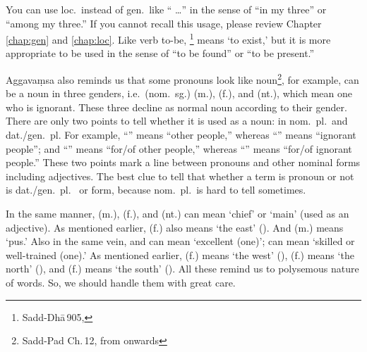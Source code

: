 
You can use loc.\ instead of gen.\ like `` \ldots'' in the sense of ``in my three'' or ``among my three.'' If you cannot recall this usage, please review Chapter \ref{chap:gen} and \ref{chap:loc}. Like verb to-be, \footnote{Sadd-Dh\=a\,905, } means `to exist,' but it is more appropriate to be used in the sense of ``to be found'' or ``to be present.''

Aggava\d msa also reminds us that some pronouns look like noun\footnote{Sadd-Pad Ch.\,12, from  onwards}, for example,  can be a noun in three genders, i.e.\ (nom.\ sg.)  (m.),  (f.), and  (nt.), which mean one who is ignorant. These three decline as normal noun according to their gender. There are only two points to tell whether it is used as a noun: in nom.\ pl.\ and dat./gen.\ pl. For example, ``'' means ``other people,'' whereas ``'' means ``ignorant people''; and ``'' means ``for/of other people,'' whereas ``'' means ``for/of ignorant people.'' These two points mark a line between pronouns and other nominal forms including adjectives. The best clue to tell that whether a term is pronoun or not is dat./gen.\ pl.\  or  form, because nom.\ pl.\ is hard to tell sometimes.

In the same manner,  (m.),  (f.), and  (nt.) can mean `chief' or `main' (used as an adjective). As mentioned earlier,  (f.) also means `the east' (). And  (m.) means `pus.' Also in the same vein,  and  can mean `excellent (one)';  can mean `skilled or well-trained (one).' As mentioned earlier,  (f.) means `the west' (),  (f.) means `the north' (), and  (f.) means `the south' (). All these remind us to polysemous nature of words. So, we should handle them with great care.

